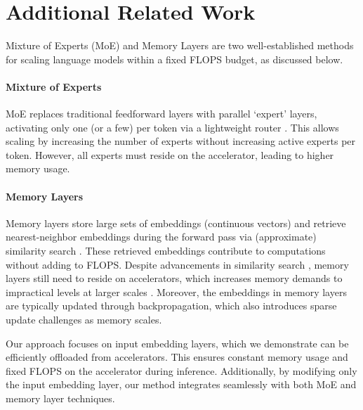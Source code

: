 \section{Additional Related Work}\label{sec:add_related_work}

Mixture of Experts (MoE) and Memory Layers  are two well-established methods for scaling language models within a fixed FLOPS budget, as discussed below.

\paragraph{Mixture of Experts} MoE   replaces traditional feedforward layers with parallel `expert' layers, activating only one (or a few) per token via a lightweight router \citep{shazeer2017outrageously,lepikhin2021gshard,fedus2022switch,jiang2024mixtral,he2024mixture}. This allows scaling by increasing the number of experts without increasing active experts per token. However, all experts must reside on the accelerator, leading to higher memory usage.

\paragraph{Memory Layers} Memory layers store large sets of embeddings (continuous vectors) and retrieve nearest-neighbor embeddings during the forward pass via (approximate) similarity search \citep{weston2014memory,sukhbaatar2015end,lample2019large,berges2024memory}. These retrieved embeddings contribute to computations without adding to FLOPS. Despite advancements in similarity search \citep{lample2019large,johnson2019billion}, memory layers still need to reside on accelerators, which increases memory demands to impractical levels at larger scales \citep{berges2024memory}. Moreover, the embeddings in memory layers are typically updated through backpropagation, which also introduces sparse update challenges as memory scales.

Our approach focuses on input embedding layers, which we demonstrate can be efficiently offloaded from accelerators. This ensures constant memory usage and fixed FLOPS on the accelerator during inference.  Additionally, by modifying only the input embedding layer, our method integrates seamlessly with both MoE and memory layer techniques.





